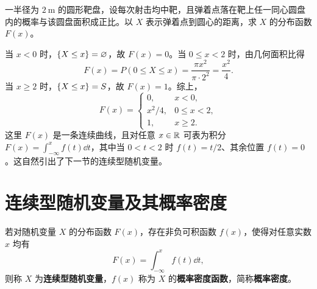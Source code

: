 \begin{example}[title={连续变化的分布函数：圆靶弹着点}]
\label{eg:target-cdf}
一半径为 $2\ \mathrm{m}$ 的圆形靶盘，设每次射击均中靶，且弹着点落在靶上任一同心圆盘内的概率与该圆盘面积成正比。以 $X$ 表示弹着点到圆心的距离，求 $X$ 的分布函数 $F(x)$。
\begin{solution}
当 $x<0$ 时，$\{X\le x\}=\varnothing$，故 $F(x)=0$。当 $0\le x<2$ 时，由几何面积比得
\[
  F(x)=P(0\le X\le x)=\frac{\pi x^2}{\pi\cdot 2^2}=\frac{x^2}{4}.
\]
当 $x\ge 2$ 时，$\{X\le x\}=S$，故 $F(x)=1$。综上，
\[
  F(x)=
  \begin{cases}
    0,& x<0,\\
    x^2/4,& 0\le x<2,\\
    1,& x\ge 2.
  \end{cases}
\]
这里 $F(x)$ 是一条连续曲线，且对任意 $x\in\mathbb{R}$ 可表为积分 $F(x)=\int_{-\infty}^{x}f(t)\dd t$，其中当 $0<t<2$ 时 $f(t)=t/2$、其余位置 $f(t)=0$。这自然引出了下一节的连续型随机变量。
\end{solution}
\end{example}

\section{连续型随机变量及其概率密度}
\label{sec:density}

\begin{definition}[连续型随机变量与概率密度]
\label{def:continuous-rv}
若对随机变量 $X$ 的分布函数 $F(x)$，存在非负可积函数 $f(x)$，使得对任意实数 $x$ 均有
\begin{equation}
  F(x)=\int_{-\infty}^{x}f(t)\dd t,
  \label{eq:density-cdf}
\end{equation}
则称 $X$ 为\textbf{连续型随机变量}，$f(x)$ 称为 $X$ 的\textbf{概率密度函数}，简称\textbf{概率密度}。
\end{definition}

